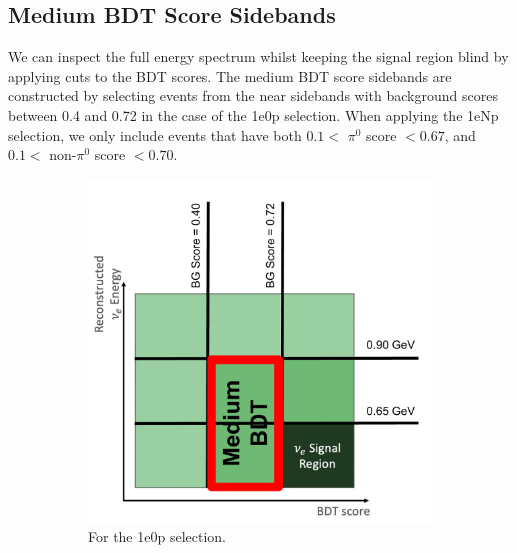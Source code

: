 \subsection{Medium BDT Score Sidebands}
\label{sec:MediumBDTScoreSidebands}

We can inspect the full energy spectrum whilst keeping the signal region blind by applying cuts to the BDT scores. The medium BDT score sidebands are constructed by selecting events from the near sidebands with background scores between 0.4 and 0.72 in the case of the 1e0p selection. When applying the 1eNp selection, we only include events that have both $0.1<$ $\pi^0$ score $< 0.67$, and $0.1<$ non-$\pi^0$ score $< 0.70$. 

\begin{figure}[H]
    \centering
    \begin{subfigure}{0.5\linewidth}
        \includegraphics[width=\linewidth]{technote/Sidebands/Figures/NearSideband/ZpMediumBDTSideband.pdf}
        \caption{For the 1e0p selection.}
    \end{subfigure}%
    \begin{subfigure}{0.5\linewidth}

\end{subfigure}
\end{figure}
